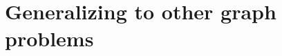 \documentclass[onefignum, onetabnum]{siamart190516}
\newcommand{\<}{\langle}
\renewcommand{\>}{\rangle}
\newcommand{\Eq}[1]{Eq.~(\ref{#1})}
\newcounter{example}
\begin{document}
\section{Generalizing to other graph problems}\label{app:otherproblems}
\end{document}

